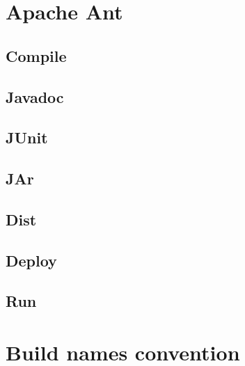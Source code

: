 \documentclass{report}
\begin{document}
\section{Apache Ant}
\subsection{Compile}
\subsection{Javadoc}
\subsection{JUnit}
\subsection{JAr}
\subsection{Dist}
\subsection{Deploy}
\subsection{Run}
\section{Build names convention}
\end{document}
